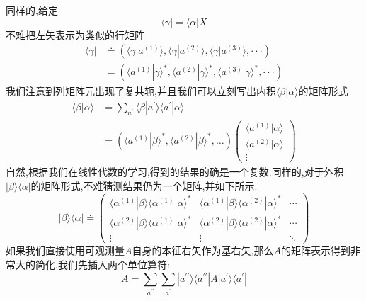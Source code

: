 同样的,给定
\begin{equation}
	\langle\gamma|=\langle\alpha|X
\end{equation}
不难把左矢表示为类似的行矩阵
\begin{equation}
	\begin{aligned}\langle\gamma|&\doteq(\langle\gamma|a^{(1)}\rangle,\langle\gamma|a^{(2)}\rangle,\langle\gamma|a^{(3)}\rangle,\cdotp\cdotp\cdotp)\\&=(\langle a^{(1)}|\gamma\rangle^*,\langle a^{(2)}|\gamma\rangle^*,\langle a^{(3)}|\gamma\rangle^*,\cdotp\cdotp\cdotp)\end{aligned}
\end{equation}
我们注意到列矩阵元出现了复共轭,并且我们可以立刻写出内积$\langle\beta|\alpha\rangle$的矩阵形式
\begin{equation}
	\begin{aligned}
		\langle\beta|\alpha\rangle
		&=\sum_{{u^{\prime}}}\langle\beta|a^{\prime}\rangle\langle a^{\prime}|\alpha\rangle\\
		&=(\langle a^{(1)}|\beta\rangle^{*},\langle a^{(2)}|\beta\rangle^{*},\ldots)
		\begin{pmatrix}
			\langle a^{(1)}|\alpha\rangle\\
			\langle a^{(2)}|\alpha\rangle\\
			\vdots
		\end{pmatrix}
	\end{aligned}
\end{equation}
自然,根据我们在线性代数的学习,得到的结果的确是一个复数.同样的,对于外积$|\beta\rangle\langle\alpha|$的矩阵形式,不难猜测结果仍为一个矩阵,并如下所示:
\begin{equation}
	|\beta\rangle\langle\alpha|\doteq
	\begin{pmatrix}
		\langle\alpha^{(1)}|\beta\rangle\langle\alpha^{(1)}|\alpha\rangle^*&\langle\alpha^{(1)}|\beta\rangle\langle\alpha^{(2)}|\alpha\rangle^*&\cdots\\\langle\alpha^{(2)}|\beta\rangle\langle\alpha^{(1)}|\alpha\rangle^*&\langle\alpha^{(2)}|\beta\rangle\langle\alpha^{(2)}|\alpha\rangle^*&\cdots\\\vdots&\vdots&\ddots
	\end{pmatrix}
\end{equation}
如果我们直接使用可观测量$A$自身的本征右矢作为基右矢,那么$A$的矩阵表示得到非常大的简化.我们先插入两个单位算符:
\begin{equation}
	A=\sum_{a^{\prime\prime}}\sum_{a^{\prime}}|a^{\prime\prime}\rangle\langle a^{\prime\prime}|A|a^{\prime}\rangle\langle a^{\prime}|
\end{equation}
